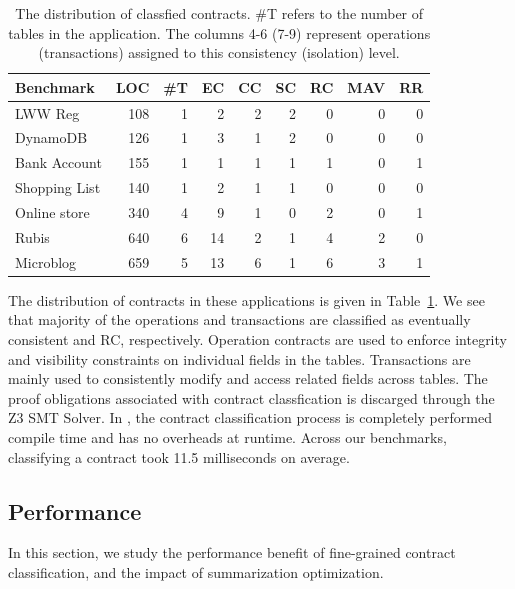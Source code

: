 \begin{table}
\setlength{\tabcolsep}{4pt}
{\sffamily \small
\begin{center}
\begin{tabular} {|l|r|r|r|r|r|r|r|r|}
\hline
{\bf Benchmark} & {\bf LOC} & {\bf \#T} & {\bf EC} & {\bf CC} & {\bf SC} & {\bf RC} & {\bf MAV} & {\bf RR} \\
\hline
{LWW Reg} & 108 & 1 & 2 & 2 & 2 & 0 & 0 & 0 \\
{DynamoDB} & 126 & 1 & 3 & 1 & 2 & 0 & 0 & 0 \\
{Bank Account} & 155 & 1 & 1 & 1 & 1 & 1 & 0 & 1 \\
{Shopping List} & 140 & 1 & 2 & 1 & 1 & 0 & 0 & 0 \\
{Online store} & 340 & 4 & 9 & 1 & 0 & 2 & 0 & 1 \\
{Rubis} & 640 & 6 & 14 & 2 & 1 & 4 & 2 & 0 \\
{Microblog} & 659 & 5 & 13 & 6 & 1 & 6 & 3 & 1 \\
\hline
\end{tabular}
\end{center} }
\caption{The distribution of classfied contracts. \#T refers to the number of
tables in the application. The columns 4-6 (7-9) represent operations
(transactions) assigned to this consistency (isolation) level.}
\label{tab:ctrts}
\end{table}

The distribution of contracts in these applications is given in
Table~\ref{tab:ctrts}. We see that majority of the operations and transactions
are classified as eventually consistent and RC, respectively. Operation
contracts are used to enforce integrity and visibility constraints on
individual fields in the tables. Transactions are mainly used to consistently
modify and access related fields across tables. The proof obligations
associated with contract classfication is discarged through the Z3 SMT Solver.
In \name, the contract classification process is completely performed compile
time and has no overheads at runtime. Across our benchmarks, classifying a
contract took 11.5 milliseconds on average.

\subsection{Performance}

In this section, we study the performance benefit of fine-grained contract
classification, and the impact of summarization optimization.

